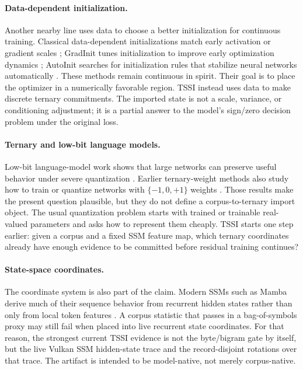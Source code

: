 \documentclass{article}
\begin{document}
\paragraph{Data-dependent initialization.}
Another nearby line uses data to choose a better initialization for continuous
training. Classical data-dependent initializations match early activation or
gradient scales \citep{krahenbuhl2015data}; GradInit tunes initialization to
improve early optimization dynamics \citep{zhang2021gradinit}; AutoInit searches
for initialization rules that stabilize neural networks automatically
\citep{bingham2021autoinit}. These methods remain continuous in spirit. Their
goal is to place the optimizer in a numerically favorable region. TSSI instead
uses data to make discrete ternary commitments. The imported state is not a
scale, variance, or conditioning adjustment; it is a partial answer to the
model's sign/zero decision problem under the original loss.

\paragraph{Ternary and low-bit language models.}
Low-bit language-model work shows that large networks can preserve useful
behavior under severe quantization \citep{wang2023bitnet, ma2024era}. Earlier
ternary-weight methods also study how to train or quantize networks with
$\{-1,0,+1\}$ weights \citep{li2016ternary}. Those results make the present
question plausible, but they do not define a corpus-to-ternary import object.
The usual quantization problem starts with trained or trainable real-valued
parameters and asks how to represent them cheaply. TSSI starts one step earlier:
given a corpus and a fixed SSM feature map, which ternary coordinates already
have enough evidence to be committed before residual training continues?

\paragraph{State-space coordinates.}
The coordinate system is also part of the claim. Modern SSMs such as Mamba
derive much of their sequence behavior from recurrent hidden states rather than
only from local token features \citep{gu2024mamba}. A corpus statistic that
passes in a bag-of-symbols proxy may still fail when placed into live recurrent
state coordinates. For that reason, the strongest current TSSI evidence is not
the byte/bigram gate by itself, but the live Vulkan SSM hidden-state trace and
the record-disjoint rotations over that trace. The artifact is intended to be
model-native, not merely corpus-native.
\end{document}
